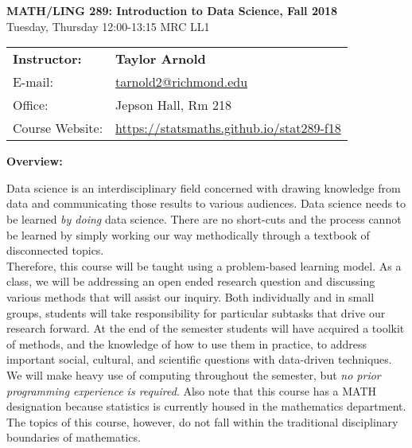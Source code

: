 \documentclass[12pt]{article}
\begin{document}
\begin{center}
{\bf MATH/LING 289: Introduction to Data Science, Fall 2018} \\
Tuesday, Thursday 12:00-13:15 \quad MRC LL1\\
\end{center}

\bigskip

\noindent
\begin{tabular}{ l l }
{\bf Instructor:} &  {\bf Taylor Arnold} \\
E-mail: & \href{mailto:tarnold2@richmond.edu}{tarnold2@richmond.edu} \\
Office: & Jepson Hall, Rm 218 \\
Course Website: & \url{https://statsmaths.github.io/stat289-f18}
\end{tabular}

\vspace{0.5cm}

\textbf{Overview:} \vspace{6pt}

Data science is an interdisciplinary field concerned with drawing knowledge
from data and communicating those results to various audiences. Data
science needs to be learned \textit{by doing} data science. There are
no short-cuts and the process cannot be learned by simply working our way
methodically through a textbook of disconnected topics.\\

Therefore, this course will be taught using a problem-based learning model. As
a class, we will be addressing an open ended research question and discussing
various methods that will assist our inquiry. Both individually and in small
groups, students will take responsibility for particular subtasks that drive
our research forward. At the end of the semester students will have acquired
a toolkit of methods, and the knowledge of how to use them in practice, to
address important social, cultural, and scientific questions with data-driven
techniques.\\

We will make heavy use of computing throughout the semester, but \textit{no
prior programming experience is required}. Also note that this course has a
MATH designation because statistics is currently housed in the mathematics
department. The topics of this course, however, do not fall within the
traditional disciplinary boundaries of mathematics.

\bigskip
\end{document}
